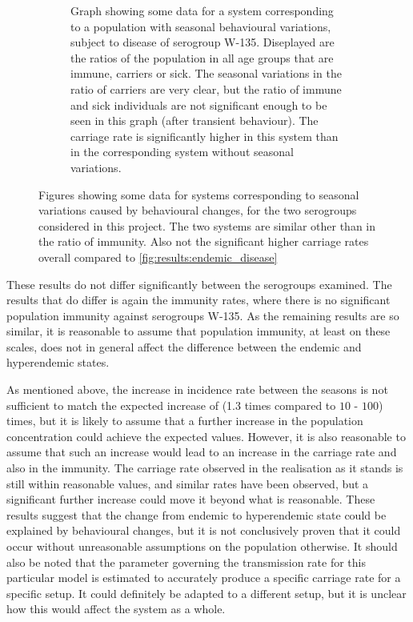\documentclass[10pt,a4paper]{article}
\begin{document}
\begin{figure}
\begin{subfigure}{0.45\textwidth}
		\caption{Graph showing some data for a system corresponding to a population with seasonal behavioural variations, subject to disease of serogroup W-135. Diseplayed are the ratios of the population in all age groups that are immune, carriers or sick. The seasonal variations in the ratio of carriers are very clear, but the ratio of immune and sick individuals are not significant enough to be seen in this graph (after transient behaviour). The carriage rate is significantly higher in this system than in the corresponding system without seasonal variations.} \label{fig:results:seasonal_disease_W135}
	\end{subfigure}
	\caption{Figures showing some data for systems corresponding to seasonal variations caused by behavioural changes, for the two serogroups considered in this project. The two systems are similar other than in the ratio of immunity. Also not the significant higher carriage rates overall compared to \cref{fig:results:endemic_disease}} \label{fig:results:seasonal_disease}
\end{figure}

These results do not differ significantly between the serogroups examined. The results that do differ is again the immunity rates, where there is no significant population immunity against serogroups W-135. As the remaining results are so similar, it is reasonable to assume that population immunity, at least on these scales, does not in general affect the difference between the endemic and hyperendemic states.

As mentioned above, the increase in incidence rate between the seasons is not sufficient to match the expected increase of (1.3 times compared to $10$ - $100$) times, but it is likely to assume that a further increase in the population concentration could achieve the expected values. However, it is also reasonable to assume that such an increase would lead to an increase in the carriage rate and also in the immunity. The carriage rate observed in the realisation as it stands is still within reasonable values, and similar rates have been observed, but a significant further increase could move it beyond what is reasonable. These results suggest that the change from endemic to hyperendemic state could be explained by behavioural changes, but it is not conclusively proven that it could occur without unreasonable assumptions on the population otherwise. It should also be noted that the parameter governing the transmission rate for this particular model is estimated to accurately produce a specific carriage rate for a specific setup. It could definitely be adapted to a different setup, but it is unclear how this would affect the system as a whole.
\end{document}
